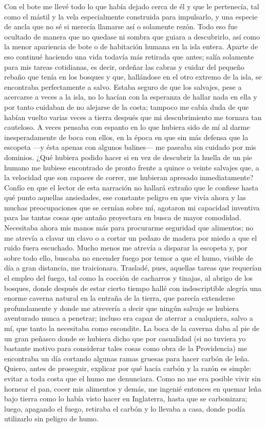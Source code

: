 \documentclass{novela}
\begin{document}
    Con el bote me llevé todo lo que había dejado cerca de él y que le pertenecía, tal como el mástil y la vela especialmente construida para impulsarlo, y una especie de ancla que no sé si merecía llamarse así o solamente rezón. Todo eso fue ocultado de manera que no quedase ni sombra que guiara a descubrirlo, así como la menor apariencia de bote o de habitación humana en la isla entera.
    Aparte de eso continué haciendo una vida todavía más retirada que antes; salía solamente para mis tareas cotidianas, es decir, ordeñar las cabras y cuidar del pequeño rebaño que tenía en los bosques y que, hallándose en el otro extremo de la isla, se encontraba perfectamente a salvo. Estaba seguro de que los salvajes, pese a acercarse a veces a la isla, no lo hacían con la esperanza de hallar nada en ella y por tanto cuidaban de no alejarse de la costa; tampoco me cabía duda de que habían vuelto varias veces a tierra después que mi descubrimiento me tornara tan cauteloso. A veces pensaba con espanto en lo que hubiera sido de mí al darme inesperadamente de boca con ellos, en la época en que sin más defensa que la escopeta —y ésta apenas con algunos balines— me paseaba sin cuidado por mis dominios. ¿Qué hubiera podido hacer si en vez de descubrir la huella de un pie humano me hubiese encontrado de pronto frente a quince o veinte salvajes que, a la velocidad que son capaces de correr, me hubieran apresado inmediatamente?
    Confío en que el lector de esta narración no hallará extraño que le confiese hasta qué punto aquellas ansiedades, ese constante peligro en que vivía ahora y las muchas preocupaciones que se cernían sobre mí, agotaron mi capacidad inventiva para las tantas cosas que antaño proyectara en busca de mayor comodidad. Necesitaba ahora mis manos más para procurarme seguridad que alimentos; no me atrevía a clavar un clavo o a cortar un pedazo de madera por miedo a que el ruido fuera escuchado. Mucho menos me atrevía a disparar la escopeta y, por sobre todo ello, buscaba no encender fuego por temor a que el humo, visible de día a gran distancia, me traicionara. Trasladé, pues, aquellas tareas que requerían el empleo del fuego, tal como la cocción de cacharros y tinajas, al abrigo de los bosques, donde después de estar cierto tiempo hallé con indescriptible alegría una enorme caverna natural en la entraña de la tierra, que parecía extenderse profundamente y donde me atrevería a decir que ningún salvaje se hubiera aventurado nunca a penetrar; incluso era capaz de aterrar a cualquiera, salvo a mí, que tanto la necesitaba como escondite.
    La boca de la caverna daba al pie de un gran peñasco donde se hubiera dicho que por casualidad (si no tuviera yo bastante motivo para considerar tales cosas como obra de la Providencia) me encontraba un día cortando algunas ramas gruesas para hacer carbón de leña. Quiero, antes de proseguir, explicar por qué hacía carbón y la razón es simple: evitar a toda costa que el humo me denunciara. Como no me era posible vivir sin hornear el pan, cocer mis alimentos y demás, me ingenié entonces en quemar leña bajo tierra como lo había visto hacer en Inglaterra, hasta que se carbonizara; luego, apagando el fuego, retiraba el carbón y lo llevaba a casa, donde podía utilizarlo sin peligro de humo.
\end{document}

